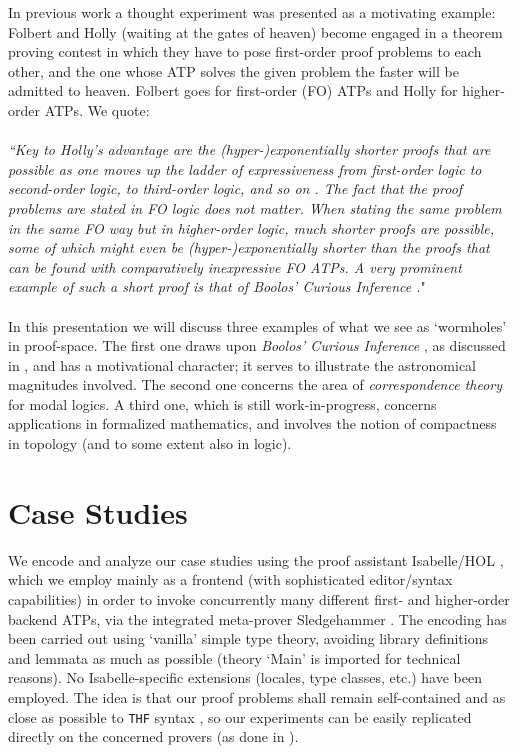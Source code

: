 \documentclass{article}
\begin{document}
In previous work \cite{BCPpaper} a thought experiment was presented as a motivating example: Folbert and Holly (waiting at the gates of heaven) become engaged in a theorem proving contest in which they have to pose first-order proof problems to each other, and the one whose ATP solves the given problem the faster will be admitted to heaven. Folbert goes for first-order (FO) ATPs and Holly for higher-order ATPs. We quote:
\\ \\
\textit{``Key to Holly's advantage are the (hyper-)exponentially shorter proofs that are possible as one moves up the ladder of expressiveness from first-order logic to second-order logic, to third-order logic, and so on  \cite{GoedelProofLength}. The fact that the proof problems are stated in FO logic does not matter. When stating the same problem in the same FO way but in higher-order logic, much shorter proofs are possible, some of which might even be (hyper-)exponentially shorter than the proofs that can be found with comparatively inexpressive FO ATPs. A very prominent example of such a short proof is that of \emph{Boolos' Curious Inference} \cite{BCI}.}"
\\ \\
In this presentation we will discuss three examples of what we see as `wormholes' in proof-space. The first one draws upon \emph{Boolos' Curious Inference} \cite{BCI}, as discussed in \cite{BCPpaper}, and has a motivational character; it serves to illustrate the astronomical magnitudes involved. The second one concerns the area of \textit{correspondence theory} for modal logics. A third one, which is still work-in-progress, concerns applications in formalized mathematics, and involves the notion of compactness in topology (and to some extent also in logic).


\section{Case Studies}
We encode and analyze our case studies using the proof assistant Isabelle/HOL \cite{Isabelle}, which we employ mainly as a frontend (with sophisticated editor/syntax capabilities) in order to invoke concurrently many different first- and higher-order backend ATPs, via the integrated meta-prover Sledgehammer \cite{blanchette2016hammering}. The encoding has been carried out using `vanilla' simple type theory, avoiding library definitions and lemmata as much as possible (theory `Main' is imported for technical reasons). No Isabelle-specific extensions (locales, type classes, etc.) have been employed. The idea is that our proof problems shall remain self-contained and as close as possible to \texttt{THF} syntax \cite{THF}, so our experiments can be easily replicated directly on the concerned provers (as done in \cite{BCPpaper}).
\end{document}
